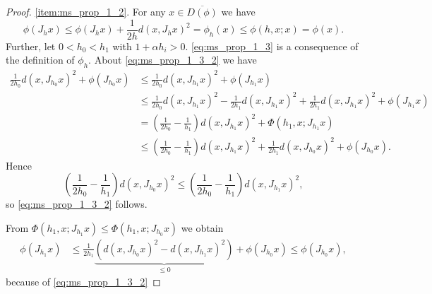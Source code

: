 \documentclass[a4paper,11pt, leqno]{scrreprt} %
\renewcommand{\leq}{\leqslant}
\renewcommand{\leq}{\leqslant}
\theoremstyle{change}
\theoremstyle{nonumberplain}
\newtheorem{proof}{Proof}
\begin{document}
\begin{proof}
  \ref{item:ms_prop_1_2}. For any $x \in \overline{D(\phi)}$ we have
  \begin{equation}
    \label{eq:ms_prop_1_10}
    \phi(J_h x) \leq \phi(J_h x) + \frac1{2h} d(x, J_h x)^2 =
    \phi_h(x) \leq \phi(h, x;x) = \phi(x).
  \end{equation}
  Further, let $0 < h_0 < h_1$ with $1 + \alpha h_i >
  0$. \eqref{eq:ms_prop_1_3} is a consequence of the definition of
  $\phi_h$. About \eqref{eq:ms_prop_1_3_2} we have
  \begin{equation}
    \label{eq:ms_prop_1_11}
    \begin{split}
      \frac1{2h_0} d(x, J_{h_0} x)^2 + \phi(J_{h_0} x) &\leq
      \frac1{2h_0} d(x, J_{h_1} x)^2 + \phi(J_{h_1} x)\\
      &\leq \frac1{2h_0} d(x, J_{h_1} x)^2 - \frac1{2h_1} d(x, J_{h_1}
      x)^2 + \frac1{2h_1} d(x, J_{h_1} x)^2 + \phi(J_{h_1} x)\\
      &=\left (\frac1{2h_0} - \frac1{h_1} \right ) d(x, J_{h_1} x)^2 +
      \Phi(h_1, x; J_{h_1} x)\\
      &\leq \left (\frac1{2h_0} - \frac1{h_1} \right ) d(x, J_{h_1}
      x)^2 + \frac1{2h_1} d(x, J_{h_0} x)^2 + \phi(J_{h_0} x).
    \end{split}
  \end{equation}
  Hence
  \begin{equation}
    \label{eq:ms_prop_1_12}
    \left (\frac1{2h_0} - \frac1{h_1} \right ) d(x, J_{h_0} x)^2 \leq \left (\frac1{2h_0} - \frac1{h_1} \right ) d(x, J_{h_1} x)^2,
  \end{equation}
  so \eqref{eq:ms_prop_1_3_2} follows.

  From $\Phi(h_1, x; J_{h_1} x) \leq \Phi(h_1, x; J_{h_0} x)$ we
  obtain
  \begin{equation}
    \label{eq:ms_prop_1_13}
    \begin{split}
      \phi(J_{h_1} x) &\leq \frac1{2h_1} \underbrace{(d(x, J_{h_0} x)^2 - d(x,
      J_{h_1} x)^2)}_{\leq 0} + \phi(J_{h_0} x) \leq \phi(J_{h_0} x),
    \end{split}
  \end{equation}
  because of \eqref{eq:ms_prop_1_3_2}


\end{proof}
\end{document}
